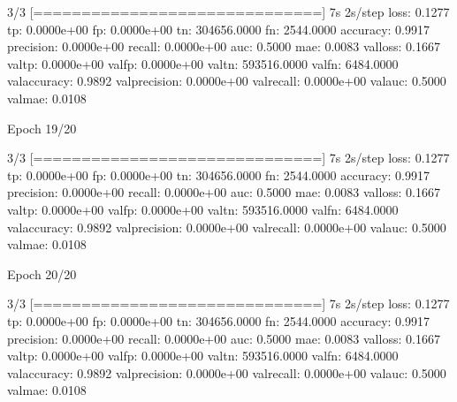 \documentclass[letterpaper,10pt,english]{sphinxmanual}
\begin{document}
\begin{sphinxVerbatim}[commandchars=\\\{\}]
3/3 [==============================] \PYGZhy{} 7s 2s/step \PYGZhy{} loss: 0.1277 \PYGZhy{} tp: 0.0000e+00 \PYGZhy{} fp: 0.0000e+00 \PYGZhy{} tn: 304656.0000 \PYGZhy{} fn: 2544.0000 \PYGZhy{} accuracy: 0.9917 \PYGZhy{} precision: 0.0000e+00 \PYGZhy{} recall: 0.0000e+00 \PYGZhy{} auc: 0.5000 \PYGZhy{} mae: 0.0083 \PYGZhy{} val\PYGZus{}loss: 0.1667 \PYGZhy{} val\PYGZus{}tp: 0.0000e+00 \PYGZhy{} val\PYGZus{}fp: 0.0000e+00 \PYGZhy{} val\PYGZus{}tn: 593516.0000 \PYGZhy{} val\PYGZus{}fn: 6484.0000 \PYGZhy{} val\PYGZus{}accuracy: 0.9892 \PYGZhy{} val\PYGZus{}precision: 0.0000e+00 \PYGZhy{} val\PYGZus{}recall: 0.0000e+00 \PYGZhy{} val\PYGZus{}auc: 0.5000 \PYGZhy{} val\PYGZus{}mae: 0.0108
\end{sphinxVerbatim}

\begin{sphinxVerbatim}[commandchars=\\\{\}]
Epoch 19/20
\end{sphinxVerbatim}

\begin{sphinxVerbatim}[commandchars=\\\{\}]
3/3 [==============================] \PYGZhy{} 7s 2s/step \PYGZhy{} loss: 0.1277 \PYGZhy{} tp: 0.0000e+00 \PYGZhy{} fp: 0.0000e+00 \PYGZhy{} tn: 304656.0000 \PYGZhy{} fn: 2544.0000 \PYGZhy{} accuracy: 0.9917 \PYGZhy{} precision: 0.0000e+00 \PYGZhy{} recall: 0.0000e+00 \PYGZhy{} auc: 0.5000 \PYGZhy{} mae: 0.0083 \PYGZhy{} val\PYGZus{}loss: 0.1667 \PYGZhy{} val\PYGZus{}tp: 0.0000e+00 \PYGZhy{} val\PYGZus{}fp: 0.0000e+00 \PYGZhy{} val\PYGZus{}tn: 593516.0000 \PYGZhy{} val\PYGZus{}fn: 6484.0000 \PYGZhy{} val\PYGZus{}accuracy: 0.9892 \PYGZhy{} val\PYGZus{}precision: 0.0000e+00 \PYGZhy{} val\PYGZus{}recall: 0.0000e+00 \PYGZhy{} val\PYGZus{}auc: 0.5000 \PYGZhy{} val\PYGZus{}mae: 0.0108
\end{sphinxVerbatim}

\begin{sphinxVerbatim}[commandchars=\\\{\}]
Epoch 20/20
\end{sphinxVerbatim}

\begin{sphinxVerbatim}[commandchars=\\\{\}]
3/3 [==============================] \PYGZhy{} 7s 2s/step \PYGZhy{} loss: 0.1277 \PYGZhy{} tp: 0.0000e+00 \PYGZhy{} fp: 0.0000e+00 \PYGZhy{} tn: 304656.0000 \PYGZhy{} fn: 2544.0000 \PYGZhy{} accuracy: 0.9917 \PYGZhy{} precision: 0.0000e+00 \PYGZhy{} recall: 0.0000e+00 \PYGZhy{} auc: 0.5000 \PYGZhy{} mae: 0.0083 \PYGZhy{} val\PYGZus{}loss: 0.1667 \PYGZhy{} val\PYGZus{}tp: 0.0000e+00 \PYGZhy{} val\PYGZus{}fp: 0.0000e+00 \PYGZhy{} val\PYGZus{}tn: 593516.0000 \PYGZhy{} val\PYGZus{}fn: 6484.0000 \PYGZhy{} val\PYGZus{}accuracy: 0.9892 \PYGZhy{} val\PYGZus{}precision: 0.0000e+00 \PYGZhy{} val\PYGZus{}recall: 0.0000e+00 \PYGZhy{} val\PYGZus{}auc: 0.5000 \PYGZhy{} val\PYGZus{}mae: 0.0108
\end{sphinxVerbatim}
\end{document}
